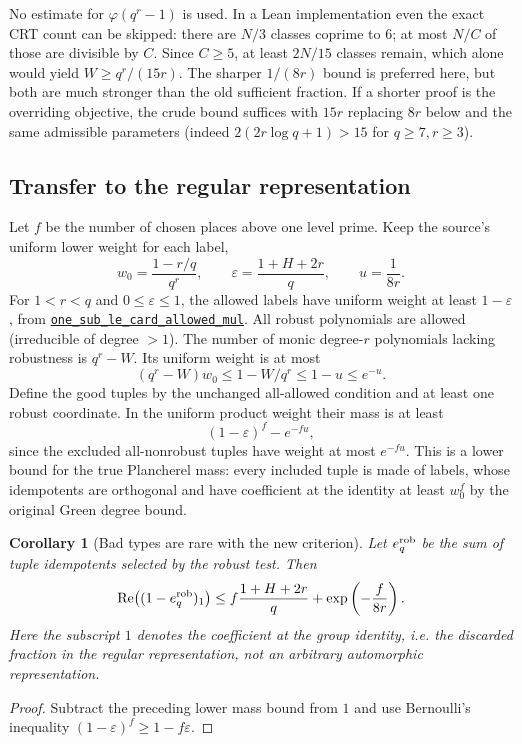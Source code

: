 \documentclass[11pt]{article}
\newtheorem{corollary}[theorem]{Corollary}
\theoremstyle{definition}\newtheorem{definition}[theorem]{Definition}
\newcommand{\src}[2]{\href{https://github.com/VladimirReshetnikov/ProveIt/blob/ee10f937fedac0955d28b7b860f4c44fab508204/Analysis/GeneralizedRiemannHypothesis/Lean/grh/src/#1}{\texttt{#2}}}
\begin{document}
No estimate for $\varphi(q^r-1)$ is used. In a Lean implementation even the exact CRT count can be skipped: there are $N/3$ classes coprime to $6$; at most $N/C$ of those are divisible by $C$. Since $C\ge5$, at least $2N/15$ classes remain, which alone would yield $W\ge q^r/(15r)$. The sharper $1/(8r)$ bound is preferred here, but both are much stronger than the old sufficient fraction. If a shorter proof is the overriding objective, the crude bound suffices with $15r$ replacing $8r$ below and the same admissible parameters (indeed $2(2r\log q+1)>15$ for $q\ge7,r\ge3$).

\subsection{Transfer to the regular representation}
Let $f$ be the number of chosen places above one level prime. Keep the source's uniform lower weight for each label,
\[
 w_0=\frac{1-r/q}{q^r},\qquad
 \varepsilon=\frac{1+H+2r}{q},\qquad u=\frac{1}{8r}.
\]
For $1<r<q$ and $0\le\varepsilon\le1$, the allowed labels have uniform weight at least $1-\varepsilon$, from \src{New/Spanning/MainTerm/BadTypes.lean\#L134}{one\_sub\_le\_card\_allowed\_mul}. All robust polynomials are allowed (irreducible of degree $>1$). The number of monic degree-$r$ polynomials lacking robustness is $q^r-W$. Its uniform weight is at most
\[
         (q^r-W)w_0\le 1-W/q^r\le1-u\le e^{-u}.
\]
Define the good tuples by the unchanged all-allowed condition and at least one robust coordinate. In the uniform product weight their mass is at least
\[
             (1-\varepsilon)^f-e^{-fu},
\]
since the excluded all-nonrobust tuples have weight at most $e^{-fu}$. This is a lower bound for the true Plancherel mass: every included tuple is made of labels, whose idempotents are orthogonal and have coefficient at the identity at least $w_0^f$ by the original Green degree bound.

\begin{corollary}[Bad types are rare with the new criterion]\label{cor:bad}
Let $e_q^{\rm rob}$ be the sum of tuple idempotents selected by the robust test. Then
\begin{equation}\label{eq:mass}
  \operatorname{Re}\bigl((1-e_q^{\rm rob})_1\bigr)
       \le f\frac{1+H+2r}{q}+\exp\left(-\frac{f}{8r}\right).
\end{equation}
Here the subscript $1$ denotes the coefficient at the group identity, i.e. the discarded fraction in the regular representation, not an arbitrary automorphic representation.
\end{corollary}
\begin{proof}
Subtract the preceding lower mass bound from $1$ and use Bernoulli's inequality $(1-\varepsilon)^f\ge1-f\varepsilon$.
\end{proof}
\end{document}
